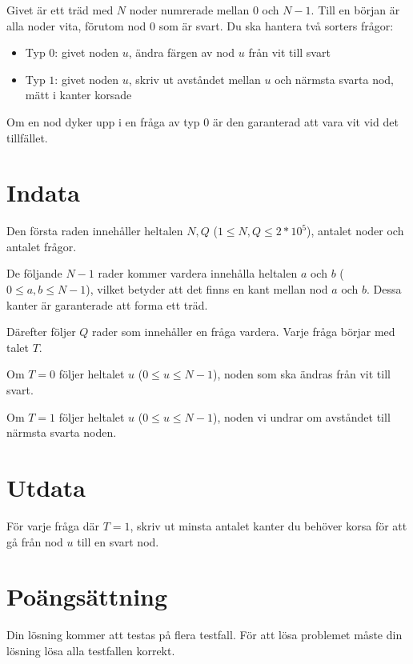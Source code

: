 Givet är ett träd med $N$ noder numrerade mellan $0$ och $N-1$. Till en början är alla noder vita,
förutom nod $0$ som är svart. Du ska hantera två sorters frågor:

\begin{itemize}
    \item Typ $0$: givet noden $u$, ändra färgen av nod $u$ från vit till svart
    \item Typ $1$: givet noden $u$, skriv ut avståndet mellan $u$ och närmsta svarta nod, mätt i kanter korsade
\end{itemize}

Om en nod dyker upp i en fråga av typ $0$ är den garanterad att vara vit vid det tillfället.


\section*{Indata}
Den första raden innehåller heltalen $N, Q$ ($1 \leq N,Q \leq 2*10^5$), antalet noder och antalet frågor.

De följande $N-1$ rader kommer vardera innehålla heltalen $a$ och $b$ ($0 \leq a,b \leq N-1$), vilket
betyder att det finns en kant mellan nod $a$ och $b$. Dessa kanter är garanterade att forma ett träd.

Därefter följer $Q$ rader som innehåller en fråga vardera. Varje fråga börjar med talet $T$.

Om $T=0$ följer heltalet $u$ ($0 \leq u \leq N-1$), noden som ska ändras från vit till svart.

Om $T=1$ följer heltalet $u$ ($0 \leq u \leq N-1$), noden vi undrar om avståndet till närmsta svarta noden.

\section*{Utdata}
För varje fråga där $T=1$, skriv ut minsta antalet kanter du behöver korsa för att gå från nod $u$ till en svart nod.

\section*{Poängsättning}
Din lösning kommer att testas på flera testfall.
\noindent
För att lösa problemet måste din lösning lösa alla testfallen korrekt.
